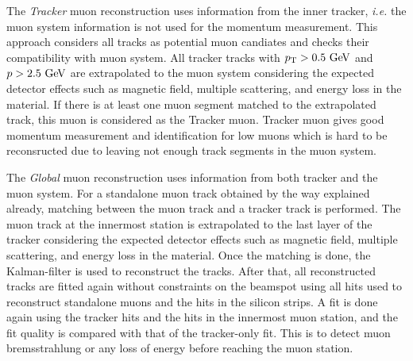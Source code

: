The \textit{Tracker} muon reconstruction uses information from  
the inner tracker, \textit{i.e.} the muon system information is not used
for the momentum measurement. This approach considers all tracks as 
potential muon candiates and checks their compatibility with 
muon system. All tracker tracks with $p_\mathrm{T}>0.5~\mathrm{Ge\kern -0.1em V}$ and $p>2.5~\mathrm{Ge\kern -0.1em V}$ 
are extrapolated to the muon system considering the expected detector effects 
such as magnetic field, multiple scattering, and energy loss in the material. 
If there is at least one muon segment matched to the 
extrapolated track, this muon is considered as the Tracker muon. 
Tracker muon gives good momentum measurement and identification for low \pt{} muons
which is hard to be reconsructed due to leaving not enough track segments 
in the muon system. 

The \textit{Global} muon reconstruction uses information from both tracker 
and the muon system. For a standalone muon track obtained by the way explained 
already, matching between the muon track and a tracker track is performed. 
The muon track at the innermost station is extrapolated to the last layer 
of the tracker considering the expected detector effects 
such as magnetic field, multiple scattering, and energy loss in the material.
Once the matching is done, the Kalman-filter is used to reconstruct the tracks. 
After that, all reconstructed tracks are fitted again without constraints on the 
beamspot using all hits used to reconstruct standalone muons and the hits 
in the silicon strips. A fit is done again using the tracker hits and the 
hits in the innermost muon station, and the fit quality is compared with 
that of the tracker-only fit. This is to detect muon bremsstrahlung  or 
any loss of energy before reaching the muon station.


